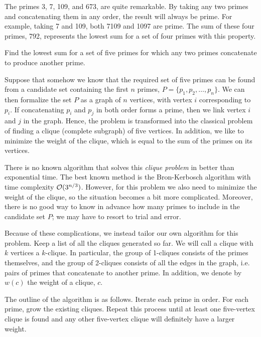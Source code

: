 

\newcommand{\vC}{\mathbf{C}}




The primes 3, 7, 109, and 673, are quite remarkable. By taking any two primes and concatenating them in any order, the result will always be prime. For example, taking 7 and 109, both 7109 and 1097 are prime. The sum of these four primes, 792, represents the lowest sum for a set of four primes with this property.
 
Find the lowest sum for a set of five primes for which any two primes concatenate to produce another prime.

\solution

Suppose that somehow we know that the required set of five primes can be found from a candidate set containing the first $n$ primes, $P = \{ p_1, p_2, \ldots, p_n \}$. We can then formalize the set $P$ as a graph of $n$ vertices, with vertex $i$ corresponding to $p_i$. If concatenating $p_i$ and $p_j$ in both order forms a prime, then we link vertex $i$ and $j$ in the graph. Hence, the problem is transformed into the classical problem of finding a clique (complete subgraph) of five vertices. In addition, we like to minimize the weight of the clique, which is equal to the sum of the primes on its vertices. 

There is no known algorithm that solves this \emph{clique problem} in better than exponential time. The best known method is the Bron-Kerbosch algorithm with time complexity $\mathcal{O}(3^{n/3})$. However, for this problem we also need to minimize the weight of the clique, so the situation becomes a bit more complicated. Moreover, there is no good way to know in advance how many primes to include in the candidate set $P$; we may have to resort to trial and error.

Because of these complications, we instead tailor our own algorithm for this problem. Keep a list of all the cliques generated so far. We will call a clique with $k$ vertices a $k$-clique. In particular, the group of 1-cliques consists of the primes themselves, and the group of 2-cliques consists of all the edges in the graph, i.e. pairs of primes that concatenate to another prime. In addition, we denote by $w(c)$ the weight of a clique, $c$.

The outline of the algorithm is as follows. Iterate each prime in order. For each prime, grow the existing cliques. Repeat this process until at least one five-vertex clique is found and any other five-vertex clique will definitely have a larger weight.

